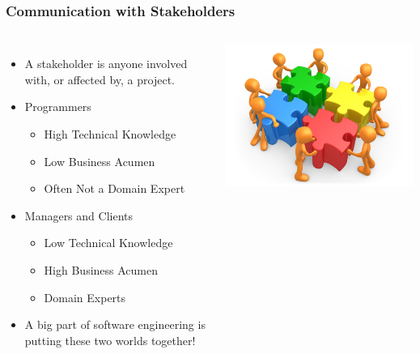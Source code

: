 \documentclass{beamer}
\begin{document}
\begin{frame}
    \frametitle{Communication with Stakeholders}
    \begin{columns}
        \begin{itemize}[<+->]
            \item A stakeholder is anyone involved with, or affected by, a project.
            \item Programmers
            \begin{itemize}[<+->]
                \item High Technical Knowledge
                \item Low Business Acumen 
                \item Often Not a Domain Expert
            \end{itemize}
            \item Managers and Clients
            \begin{itemize}[<+->]
                \item Low Technical Knowledge
                \item High Business Acumen
                \item Domain Experts
            \end{itemize}
            \item A big part of software engineering is putting these two worlds  together!
        \end{itemize}
        \includegraphics[width=\textwidth]{images/stakeholders}
    \end{columns}
\end{frame}
\end{document}
